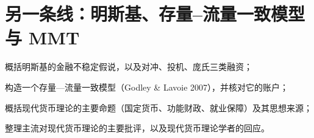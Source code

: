 \chapter{另一条线：明斯基、存量–流量一致模型与 MMT}\label{ch:minsky}

\begin{chapterguide}
\begin{guidegoals}
\item 概括明斯基的金融不稳定假说，以及对冲、投机、庞氏三类融资；
\item 构造一个存量—流量一致模型（Godley \& Lavoie 2007），并核对它的账户；
\item 概括现代货币理论的主要命题（国定货币、功能财政、就业保障）及其思想来源；
\item 整理主流对现代货币理论的主要批评，以及现代货币理论学者的回应。
\end{guidegoals}
\end{chapterguide}

\chapterstub
